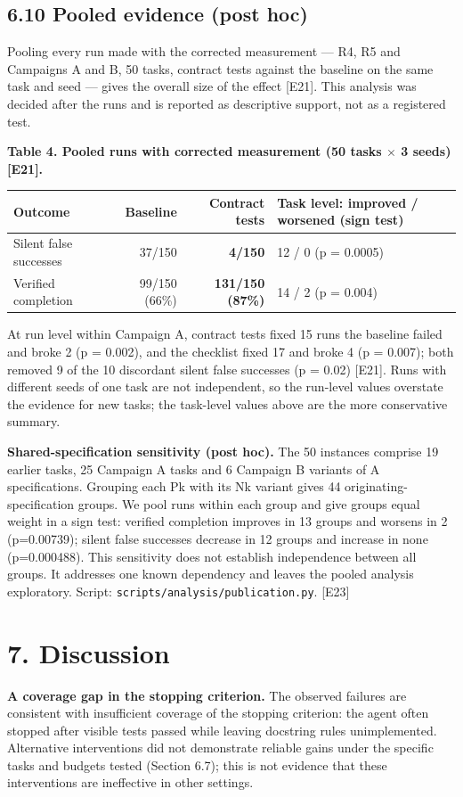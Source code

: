 \documentclass[11pt]{article}
\newcommand{\code}[1]{\texttt{#1}}
\begin{document}
\subsection*{6.10 Pooled evidence (post hoc)}
Pooling every run made with the corrected measurement — R4, R5 and Campaigns A and B, 50 tasks, contract tests against the baseline on the same task and seed — gives the overall size of the effect [E21]. This analysis was decided after the runs and is reported as descriptive support, not as a registered test.

\textbf{Table 4. Pooled runs with corrected measurement (50 tasks $\times$ 3 seeds) [E21].}

\begin{center}\small
\begin{tabularx}{\linewidth}{LRRL}
\toprule
Outcome & Baseline & Contract tests & Task level: improved / worsened (sign test) \\
\midrule
Silent false successes & 37/150 & \textbf{4/150} & 12 / 0 (p = 0.0005) \\
Verified completion & 99/150 (66\%) & \textbf{131/150 (87\%)} & 14 / 2 (p = 0.004) \\
\bottomrule
\end{tabularx}
\end{center}
At run level within Campaign A, contract tests fixed 15 runs the baseline failed and broke 2 (p = 0.002), and the checklist fixed 17 and broke 4 (p = 0.007); both removed 9 of the 10 discordant silent false successes (p = 0.02) [E21]. Runs with different seeds of one task are not independent, so the run-level values overstate the evidence for new tasks; the task-level values above are the more conservative summary.

\textbf{Shared-specification sensitivity (post hoc).} The 50 instances comprise 19 earlier tasks, 25 Campaign A tasks and 6 Campaign B variants of A specifications. Grouping each Pk with its Nk variant gives 44 originating-specification groups. We pool runs within each group and give groups equal weight in a sign test: verified completion improves in 13 groups and worsens in 2 (p=0.00739); silent false successes decrease in 12 groups and increase in none (p=0.000488). This sensitivity does not establish independence between all groups. It addresses one known dependency and leaves the pooled analysis exploratory. Script: \code{scripts/\allowbreak{}analysis/\allowbreak{}publication.\allowbreak{}py}. [E23]

\section*{7. Discussion}
\textbf{A coverage gap in the stopping criterion.} The observed failures are consistent with insufficient coverage of the stopping criterion: the agent often stopped after visible tests passed while leaving docstring rules unimplemented. Alternative interventions did not demonstrate reliable gains under the specific tasks and budgets tested (Section 6.7); this is not evidence that these interventions are ineffective in other settings.
\end{document}
